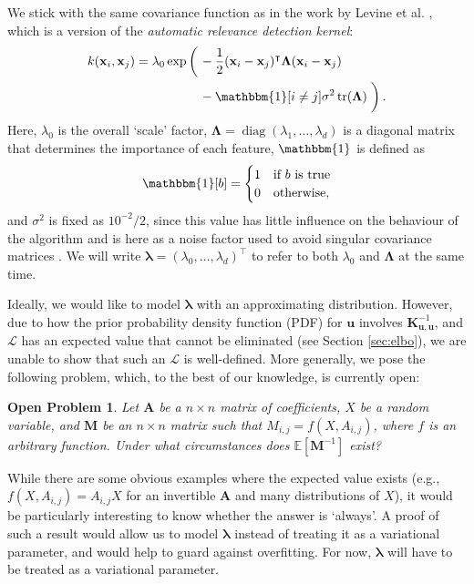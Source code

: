 \documentclass{mpaper}
\newtheorem{problem}[theorem]{Open Problem}
\DeclareMathOperator{\diag}{diag}
\DeclareMathOperator{\tr}{tr}
\newcommand{\Kuu}{\mathbf{K}_{\mathbf{u},\mathbf{u}}}
\begin{document}
We stick with the same covariance function as in the work by Levine et al.
\cite{DBLP:conf/nips/LevinePK11}, which is a version of the \emph{automatic
  relevance detection kernel}:
\begin{align*}
  k(\mathbf{x}_i, \mathbf{x}_j) = \lambda_0\exp\left( \vphantom{\frac{1}{2}} \right. &-\frac{1}{2}(\mathbf{x}_i - \mathbf{x}_j)^\intercal\bm\Lambda(\mathbf{x}_i - \mathbf{x}_j) \\
                                                                                     &- \mathbbm{1}[i \ne j]\sigma^2\tr(\bm\Lambda) \left. \vphantom{\frac{1}{2}} \right).
\end{align*}
Here, $\lambda_0$ is the overall `scale' factor, $\bm\Lambda = \diag(\lambda_1,
\dots, \lambda_d)$ is a diagonal matrix that determines the importance of each
feature, $\mathbbm{1}$ is defined as
\[
  \mathbbm{1}[b] = \begin{cases}
    1 & \mbox{if $b$ is true} \\
    0 & \mbox{otherwise},
  \end{cases}
\]
and $\sigma^2$ is fixed as $10^{-2}/2$, since this value has little influence on
the behaviour of the algorithm and is here as a noise factor used to avoid
singular covariance matrices \cite{DBLP:conf/nips/LevinePK11}. We will write
$\bm\lambda = (\lambda_0, \dots, \lambda_d)^\intercal$ to refer to both
$\lambda_0$ and $\bm\Lambda$ at the same time.

Ideally, we would like to model $\bm\lambda$ with an approximating distribution.
However, due to how the prior probability density function (PDF) for
$\mathbf{u}$ involves $\Kuu^{-1}$, and $\mathcal{L}$ has an expected value that
cannot be eliminated (see Section \ref{sec:elbo}), we are unable to show that
such an $\mathcal{L}$ is well-defined. More generally, we pose the following
problem, which, to the best of our knowledge, is currently open:
\begin{problem}
  Let $\mathbf{A}$ be a $n \times n$ matrix of coefficients, $X$ be a random
  variable, and $\mathbf{M}$ be an $n \times n$ matrix such that $M_{i,j} = f(X,
  A_{i,j})$, where $f$ is an arbitrary function. Under what circumstances does
  $\mathbb{E}[\mathbf{M}^{-1}]$ exist?
\end{problem}
While there are some obvious examples where the expected value exists (e.g.,
$f(X, A_{i,j}) = A_{i,j}X$ for an invertible $\mathbf{A}$ and many distributions
of $X$), it would be particularly interesting to know whether the answer is
`always'. A proof of such a result would allow us to model $\bm\lambda$ instead
of treating it as a variational parameter, and would help to guard against
overfitting. For now, $\bm\lambda$ will have to be treated as a variational
parameter.
\end{document}
